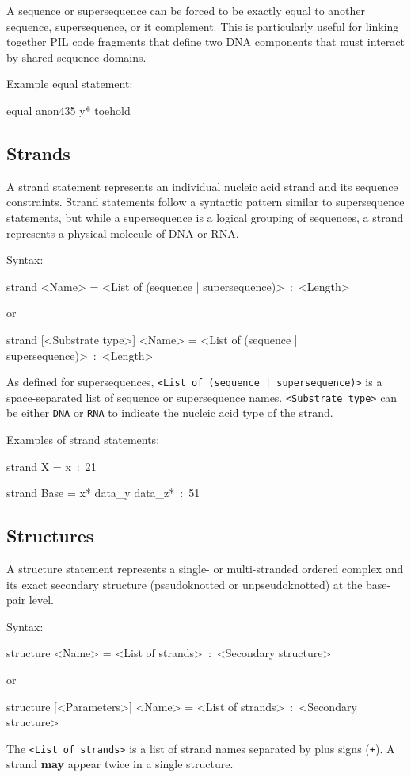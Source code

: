 \documentclass{article}
\newenvironment{code}
{\vspace{-0.1in}\par\begin{list}{}{
\setlength{\listparindent}{0pt}
\raggedright
\setlength{\itemsep}{0pt}
\setlength{\parsep}{0pt}
\normalfont\ttfamily}
 \item[]}
{\end{list}\vspace{-0.1in}}
\begin{document}
A sequence or supersequence can be forced to be exactly equal to
another sequence, supersequence, or it complement.  This is
particularly useful for linking together PIL code fragments that define two DNA components that must interact by shared sequence domains.

Example equal statement:
\begin{code}
equal anon435 y* toehold
\end{code}

\subsection{Strands}

A strand statement represents an individual nucleic acid strand and
its sequence constraints. Strand statements follow a syntactic pattern
similar to supersequence statements, but while a supersequence is a
logical grouping of sequences, a strand represents a physical molecule
of DNA or RNA.

Syntax:
\begin{code}
strand <Name> = <List of (sequence | supersequence)>~:~<Length>
\end{code}
or 
\begin{code}
strand [<Substrate type>] <Name> = <List of (sequence | supersequence)>~:~<Length>
\end{code}

As defined for supersequences, \texttt{<List of (sequence |
  supersequence)>} is a space-separated list of sequence or
supersequence names. \texttt{<Substrate type>} can be either
\texttt{DNA} or \texttt{RNA} to indicate the nucleic acid type of the
strand.

Examples of strand statements:
\begin{code}
strand X = x~:~21

strand Base = x{*} data\_y data\_z{*}~:~51
\end{code}

\subsection{Structures}

A structure statement represents a single- or multi-stranded ordered complex and its exact secondary structure (pseudoknotted or unpseudoknotted) at the base-pair level.

Syntax:
\begin{code}
structure <Name> = <List of strands>~:~<Secondary structure>
\end{code}
or
\begin{code}
structure [<Parameters>] <Name> = <List of strands>~:~<Secondary structure>
\end{code}
The \texttt{<List of strands>} is a list of strand names separated by plus signs (\texttt{+}). A strand \textbf{may} appear twice in a single structure.
\end{document}
